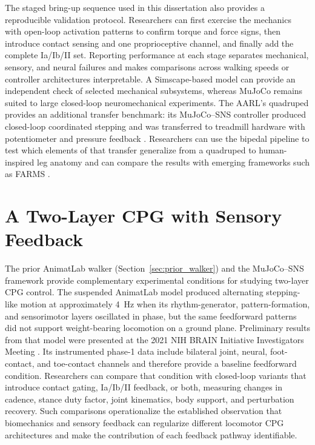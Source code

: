 The staged bring-up sequence used in this dissertation also provides a reproducible validation protocol. Researchers can first exercise the mechanics with open-loop activation patterns to confirm torque and force signs, then introduce contact sensing and one proprioceptive channel, and finally add the complete Ia/Ib/II set. Reporting performance at each stage separates mechanical, sensory, and neural failures and makes comparisons across walking speeds or controller architectures interpretable. A Simscape-based model can provide an independent check of selected mechanical subsystems, whereas MuJoCo remains suited to large closed-loop neuromechanical experiments. The AARL's quadruped provides an additional transfer benchmark: its MuJoCo--SNS controller produced closed-loop coordinated stepping and was transferred to treadmill hardware with potentiometer and pressure feedback \citep{lutz_mechanical_2025}. Researchers can use the bipedal pipeline to test which elements of that transfer generalize from a quadruped to human-inspired leg anatomy and can compare the results with emerging frameworks such as FARMS \citep{arreguit_farms_2023}.

\section{A Two-Layer CPG with Sensory Feedback}\label{sec:fw_cpg}

The prior AnimatLab walker (Section~\ref{sec:prior_walker}) and the MuJoCo--SNS framework provide complementary experimental conditions for studying two-layer CPG control. The suspended AnimatLab model produced alternating stepping-like motion at approximately 4~Hz when its rhythm-generator, pattern-formation, and sensorimotor layers oscillated in phase, but the same feedforward patterns did not support weight-bearing locomotion on a ground plane. Preliminary results from that model were presented at the 2021 NIH BRAIN Initiative Investigators Meeting \citep{bolenTorqueValuesArtificialKnee2021June15-17}. Its instrumented phase-1 data include bilateral joint, neural, foot-contact, and toe-contact channels and therefore provide a baseline feedforward condition. Researchers can compare that condition with closed-loop variants that introduce contact gating, Ia/Ib/II feedback, or both, measuring changes in cadence, stance duty factor, joint kinematics, body support, and perturbation recovery. Such comparisons operationalize the established observation that biomechanics and sensory feedback can regularize different locomotor CPG architectures \citep{deng_biomechanical_2022} and make the contribution of each feedback pathway identifiable.

